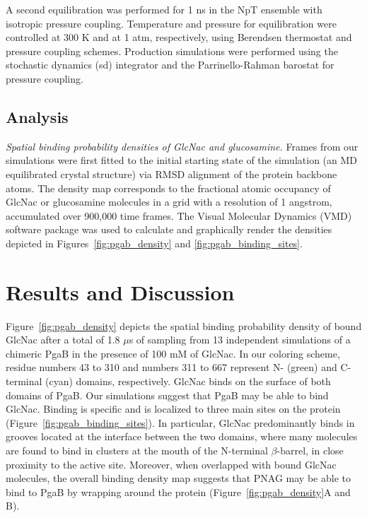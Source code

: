 A second equilibration was performed for 1 ns in the NpT ensemble with isotropic pressure coupling. Temperature and pressure for equilibration were controlled at 300 K and at 1 atm, respectively, using Berendsen thermostat and pressure coupling schemes. Production simulations were performed using the stochastic dynamics (sd) integrator and the Parrinello-Rahman barostat for pressure coupling.

\subsection{Analysis}
\emph{Spatial binding probability densities of GlcNac and glucosamine.} Frames from our simulations were first fitted to the initial starting state of the simulation (an MD equilibrated crystal structure) via RMSD alignment of the protein backbone atoms. The density map corresponds to the fractional atomic occupancy of GlcNac or glucosamine molecules in a grid with a resolution of 1 angstrom, accumulated over 900,000 time frames. The Visual Molecular Dynamics (VMD) software package was used to calculate and graphically render the densities depicted in Figures~\ref{fig:pgab_density} and \ref{fig:pgab_binding_sites}.


\section{Results and Discussion}

Figure~\ref{fig:pgab_density} depicts the spatial binding probability density of bound GlcNac after a total of 1.8 $\mu$s of sampling from 13 independent simulations of a chimeric PgaB in the presence of 100 mM of GlcNac. In our coloring scheme, residue numbers 43 to 310 and numbers 311 to 667 represent N- (green) and C-terminal (cyan) domains, respectively. GlcNac binds on the surface of both domains of PgaB. Our simulations suggest that PgaB may be able to bind GlcNac. Binding is specific and is localized to three main sites on the protein (Figure~\ref{fig:pgab_binding_sites}). In particular, GlcNac predominantly binds in grooves located at the interface between the two domains, where many molecules are found to bind in clusters at the mouth of the N-terminal $\beta$-barrel, in close proximity to the active site.  Moreover, when overlapped with bound GlcNac molecules, the overall binding density map suggests that PNAG may be able to bind to PgaB by wrapping around the protein (Figure~\ref{fig:pgab_density}A and B).

